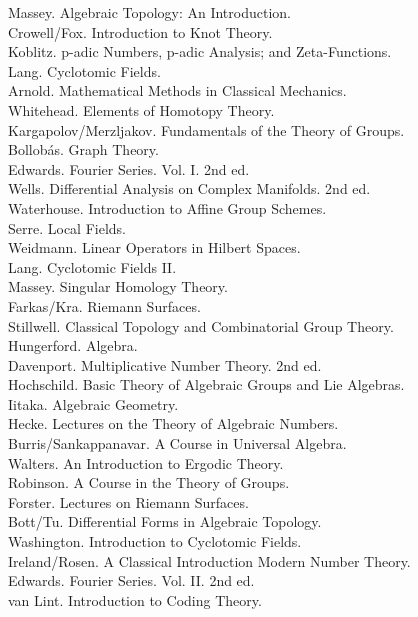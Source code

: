 \documentclass[10pt]{article}
\begin{document}
Massey. Algebraic Topology: An Introduction.\\
Crowell/Fox. Introduction to Knot Theory.\\
Koblitz. p-adic Numbers, p-adic Analysis; and Zeta-Functions.\\
Lang. Cyclotomic Fields.\\
Arnold. Mathematical Methods in Classical Mechanics.\\
Whitehead. Elements of Homotopy Theory.\\
Kargapolov/Merzljakov. Fundamentals of the Theory of Groups.\\
Bollobás. Graph Theory.\\
Edwards. Fourier Series. Vol. I. 2nd ed.\\
Wells. Differential Analysis on Complex Manifolds. 2nd ed.\\
Waterhouse. Introduction to Affine Group Schemes.\\
Serre. Local Fields.\\
Weidmann. Linear Operators in Hilbert Spaces.\\
Lang. Cyclotomic Fields II.\\
Massey. Singular Homology Theory.\\
Farkas/Kra. Riemann Surfaces.\\
Stillwell. Classical Topology and Combinatorial Group Theory.\\
Hungerford. Algebra.\\
Davenport. Multiplicative Number Theory. 2nd ed.\\
Hochschild. Basic Theory of Algebraic Groups and Lie Algebras.\\
Iitaka. Algebraic Geometry.\\
Hecke. Lectures on the Theory of Algebraic Numbers.\\
Burris/Sankappanavar. A Course in Universal Algebra.\\
Walters. An Introduction to Ergodic Theory.\\
Robinson. A Course in the Theory of Groups.\\
Forster. Lectures on Riemann Surfaces.\\
Bott/Tu. Differential Forms in Algebraic Topology.\\
Washington. Introduction to Cyclotomic Fields.\\
Ireland/Rosen. A Classical Introduction Modern Number Theory.\\
Edwards. Fourier Series. Vol. II. 2nd ed.\\
van Lint. Introduction to Coding Theory.\\
\end{document}
